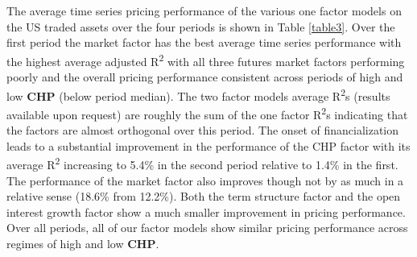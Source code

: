 \documentclass[12pt,]{article}
\begin{document}
The average time series pricing performance of the various one factor
models on the US traded assets over the four periods is shown in Table
\ref{table3}. Over the first period the market factor has the best
average time series performance with the highest average adjusted
R\textsuperscript{2} with all three futures market factors performing
poorly and the overall pricing performance consistent across periods of
high and low \textbf{CHP} (below period median). The two factor models
average R\textsuperscript{2}s (results available upon request) are
roughly the sum of the one factor R\textsuperscript{2}s indicating that
the factors are almost orthogonal over this period. The onset of
financialization leads to a substantial improvement in the performance
of the CHP factor with its average R\textsuperscript{2} increasing to
5.4\% in the second period relative to 1.4\% in the first. The
performance of the market factor also improves though not by as much in
a relative sense (18.6\% from 12.2\%). Both the term structure factor
and the open interest growth factor show a much smaller improvement in
pricing performance. Over all periods, all of our factor models show
similar pricing performance across regimes of high and low \textbf{CHP}.
\end{document}
